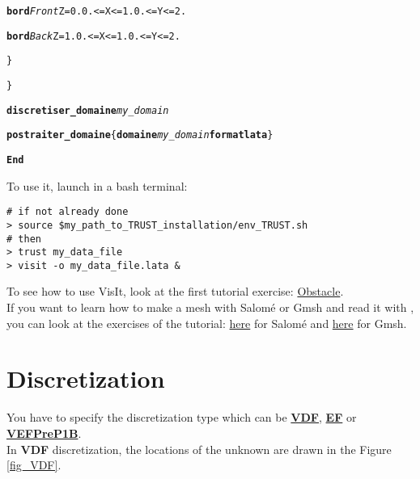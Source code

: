 \begin{center}
{\begin{minipage}[c]{0.8\textwidth}
\begin{alltt}
\hspace{2cm}        {\bf{bord}} \textit{Front}  \hspace{0.25cm} Z = 0. 0. <= X <= 1.  0. <= Y <= 2.

\hspace{2cm}        {\bf{bord}} \textit{Back}   \hspace{0.45cm} Z = 1. 0. <= X <= 1.  0. <= Y <= 2.

\hspace{1cm}    \}

\}

{\bf{discretiser\_domaine}} \textit{my\_domain}

{\bf{postraiter\_domaine}} \{ {\bf{domaine}} \textit{my\_domain} {\bf{format lata}} \}

{\bf{End}}
    \end{alltt}
\end{minipage}}
\end{center}

To use it, launch in a bash terminal:
\begin{verbatim}
# if not already done
> source $my_path_to_TRUST_installation/env_TRUST.sh
# then
> trust my_data_file
> visit -o my_data_file.lata &
\end{verbatim}

To see how to use VisIt, look at the first \trust tutorial exercise: \href{TRUST_tutorial.pdf\#exo1}{Obstacle}.\\

If you want to learn how to make a mesh with Salom\'e or Gmsh and read it with \trust, you can look at the exercises of the \trust tutorial: \href{TRUST_tutorial.pdf\#salome}{here} for Salom\'e and \href{TRUST_tutorial.pdf\#gmsh}{here} for Gmsh.







\section{Discretization}
You have to specify the discretization type which can be \href{\REFERENCEMANUAL\#vdf}{\textbf{VDF}}, \href{\REFERENCEMANUAL\#ef}{\textbf{EF}} or \href{\REFERENCEMANUAL\#vefprep1b}{\textbf{VEFPreP1B}}.\\

In \textbf{VDF} discretization, the locations of the unknown are drawn in the Figure \ref{fig_VDF}.\\

